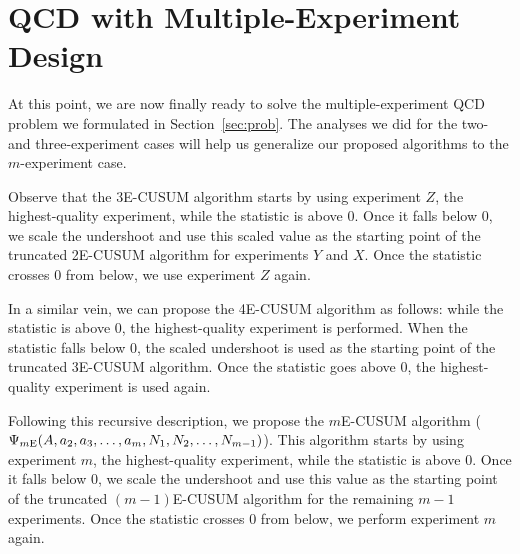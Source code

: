 \documentclass[journal, onecolumn]{IEEEtran}
\begin{document}

\section{QCD with Multiple-Experiment Design}
\label{sec:multiple-expt}

At this point, we are now finally ready to solve the multiple-experiment QCD problem we formulated in Section~\ref{sec:prob}. The analyses we did for the two- and three-experiment cases will help us generalize our proposed algorithms to the $m$-experiment case.

Observe that the 3E-CUSUM algorithm starts by using experiment $Z$, the highest-quality experiment, while the statistic is above 0. Once it falls below 0, we scale the undershoot and use this scaled value as the starting point of the truncated 2E-CUSUM algorithm for experiments $Y$ and $X$. Once the statistic crosses 0 from below, we use experiment $Z$ again.

In a similar vein, we can propose the 4E-CUSUM algorithm as follows: while the statistic is above 0, the highest-quality experiment is performed. When the statistic falls below 0, the scaled undershoot is used as the starting point of the truncated 3E-CUSUM algorithm. Once the statistic goes above 0, the highest-quality experiment is used again.

Following this recursive description, we propose the $m$E-CUSUM algorithm ($\Psi_{\textup{$m$E}} (A, a_2, a_3, \dots, a_m, N_1, N_2, \dots, N_{m - 1})$). This algorithm starts by using experiment $m$, the highest-quality experiment, while the statistic is above 0. Once it falls below 0, we scale the undershoot and use this value as the starting point of the truncated $(m - 1)$E-CUSUM algorithm for the remaining $m - 1$ experiments. Once the statistic crosses 0 from below, we perform experiment $m$ again.
\end{document}
